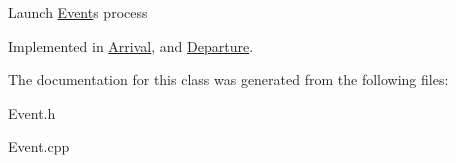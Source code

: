 Launch \hyperlink{classEvent}{Event}\textquotesingle{}s process 

Implemented in \hyperlink{classArrival_ad7da9fd4613164ece60d63be1bac6f1d}{Arrival}, and \hyperlink{classDeparture_a241611bdf4255d2ba868d58128dddc68}{Departure}.



The documentation for this class was generated from the following files\+:\begin{DoxyCompactItemize}
\item 
Event.\+h\item 
Event.\+cpp\end{DoxyCompactItemize}
